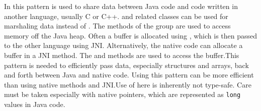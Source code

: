 \newcommand\foundinmarshalling{8}
\newcommand\usedbymarshalling{3690}
\newcommand\mostusedmarshalling{\marshallingmost}
\newcommand\membersmarshalling{Methods of the \smugroup{Off-Heap} and \smugroup{Off-Heap Get/Put} groups}
\newcommand\namemarshalling{Foreign Data Access and Object Marshaling}

%
{In this pattern \smu{} is used to share data between Java code and code
  written in another language, usually C or C++.
}
{ and related classes can be used for marshaling data instead of \unsafe{}.}
{The methods of the  group are used to access memory off
the Java heap. Often a buffer is allocated using ,
which is then passed to the other language using JNI. Alternatively, the
native code can allocate a buffer in a JNI method. The 
and  methods are used to access the buffer.}{This
pattern is needed to efficiently pass data, especially structures and arrays, back and forth between Java and
native code. Using this pattern can be more efficient than using native
methods and JNI.}{Use of \unsafe{} here is inherently not type-safe. Care must be
  taken especially with native pointers, which are represented as
\texttt{long} values in Java code.}

\newcommand\foundinthrow{59}
\newcommand\usedbythrow{3566}
\newcommand\mostusedthrow{\throwmost}
\newcommand\membersthrow{\member{throw\-Exception}}
\newcommand\namethrow{Throw Checked Exceptions without Being Declared}

